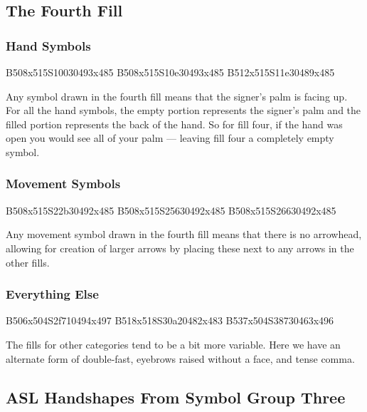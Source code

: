 \documentclass{article}
\begin{document}
\subsection{The Fourth Fill}

\subsubsection{Hand Symbols}

\begin{center}
B508x515S10030493x485 B508x515S10e30493x485 B512x515S11e30489x485
\end{center}

Any symbol drawn in the fourth fill means that the signer's palm is facing up.
For all the hand symbols, the empty portion represents the signer's palm and the filled portion represents the back of the hand.
So for fill four, if the hand was open you would see all of your palm --- leaving fill four a completely empty symbol.

\subsubsection{Movement Symbols}

\begin{center}
B508x515S22b30492x485 B508x515S25630492x485 B508x515S26630492x485
\end{center}

Any movement symbol drawn in the fourth fill means that there is no arrowhead, allowing for creation of larger arrows by placing these next to any arrows in the other fills.

\subsubsection{Everything Else}

\begin{center}
B506x504S2f710494x497 B518x518S30a20482x483 B537x504S38730463x496
\end{center}

The fills for other categories tend to be a bit more variable.
Here we have an alternate form of double-fast, eyebrows raised without a face, and tense comma.

\subsection{ASL Handshapes From Symbol Group Three}
\end{document}
